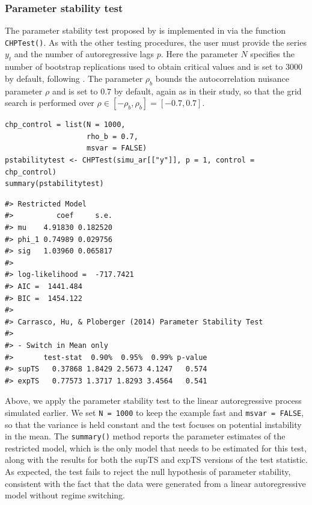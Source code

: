 \subsubsection{Parameter stability test}\label{parameter-stability-test}

The parameter stability test proposed by \citet{chp14} is implemented in  via the function \texttt{CHPTest()}. As with the other testing procedures, the user must provide the series \(y_t\) and the number of autoregressive lags \(p\). Here the parameter \(N\) specifies the number of bootstrap replications used to obtain critical values and is set to \(3000\) by default, following \citet{chp14}. The parameter \(\rho_b\) bounds the autocorrelation nuisance parameter \(\rho\) and is set to \(0.7\) by default, again as in their study, so that the grid search is performed over \(\rho \in [-\rho_b, \rho_b] = [-0.7, 0.7]\).

\begin{verbatim}
chp_control = list(N = 1000,
                   rho_b = 0.7,
                   msvar = FALSE)
pstabilitytest <- CHPTest(simu_ar[["y"]], p = 1, control = chp_control)
summary(pstabilitytest)
\end{verbatim}

\begin{verbatim}
#> Restricted Model
#>          coef     s.e.
#> mu    4.91830 0.182520
#> phi_1 0.74989 0.029756
#> sig   1.03960 0.065817
#> 
#> log-likelihood =  -717.7421
#> AIC =  1441.484
#> BIC =  1454.122
#> 
#> Carrasco, Hu, & Ploberger (2014) Parameter Stability Test 
#> 
#> - Switch in Mean only
#>       test-stat  0.90%  0.95%  0.99% p-value
#> supTS   0.37868 1.8429 2.5673 4.1247   0.574
#> expTS   0.77573 1.3717 1.8293 3.4564   0.541
\end{verbatim}

Above, we apply the parameter stability test to the linear autoregressive process simulated earlier. We set \texttt{N\ =\ 1000} to keep the example fast and \texttt{msvar\ =\ FALSE}, so that the variance is held constant and the test focuses on potential instability in the mean. The \texttt{summary()} method reports the parameter estimates of the restricted model, which is the only model that needs to be estimated for this test, along with the results for both the supTS and expTS versions of the test statistic. As expected, the test fails to reject the null hypothesis of parameter stability, consistent with the fact that the data were generated from a linear autoregressive model without regime switching.

